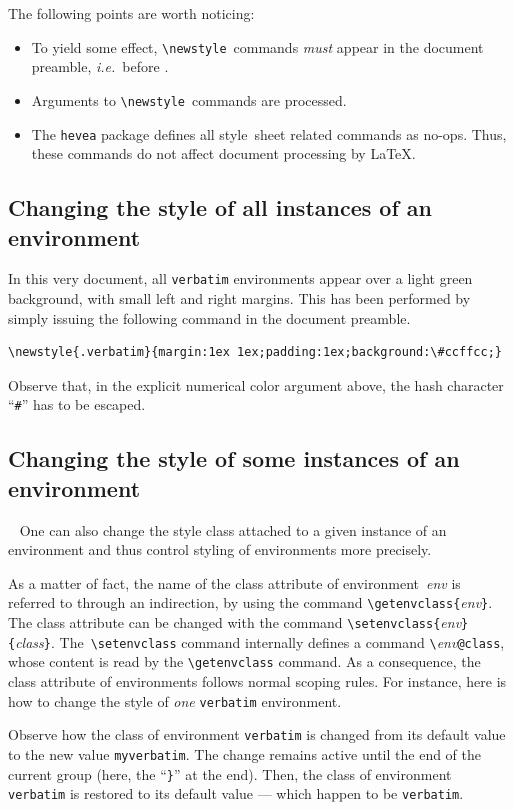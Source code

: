 The following points are worth noticing:
\begin{itemize}
\item
To yield some effect, \verb+\newstyle+~commands \emph{must} appear
in the document preamble, \emph{i.e.}\ before \verb++.
\item
Arguments to \verb+\newstyle+~commands are processed.
\item The \texttt{hevea} package defines all style~sheet related
commands as no-ops. Thus, these commands do not affect
document processing by \LaTeX{}.
\end{itemize}



\subsection{Changing \label{css:change:all}
the style of all instances of an environment}

In this very document, all \texttt{verbatim} environments appear over
a light green background, with small left and right margins.
This has been performed by simply issuing the following command in
the document preamble.
\begin{verbatim}
\newstyle{.verbatim}{margin:1ex 1ex;padding:1ex;background:\#ccffcc;}
\end{verbatim}
Observe that, in the explicit numerical color argument above, the
hash character ``\texttt{\#}'' has to be escaped.

\subsection{Changing \label{css:change}the style of some instances of an environment}\
%
One can also change the style class  attached to a given instance of
an environment and thus control styling of environments more precisely.

As a matter of fact, the name of the class attribute of
environment~\textit{env} is referred to through an indirection, by
using the command \verb+\getenvclass{+\textit{env}\verb+}+.
The class attribute can be changed with the command
\verb+\setenvclass{+\textit{env}\verb+}{+\textit{class}\verb+}+.
The~\verb+\setenvclass+ command internally defines a command
\verb+\+\textit{env}\verb+@class+, whose content is read
by the \verb+\getenvclass+ command. As a consequence, the class
attribute of environments follows normal scoping rules.
\label{getstylecolor:example}
For instance, here is how to change the style of \emph{one} \texttt{verbatim}
environment.
\bgroup{}

\egroup
Observe how the class of environment \texttt{verbatim} is changed from
its default value to the
new value \texttt{myverbatim}. The change remains active until the
end of the current group (here, the ``\texttt{\}}'' at the end). Then, the class
of environment \texttt{verbatim} is restored to its default value
--- which happen to be \texttt{verbatim}.

